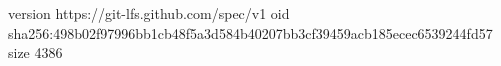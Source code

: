 version https://git-lfs.github.com/spec/v1
oid sha256:498b02f97996bb1cb48f5a3d584b40207bb3cf39459acb185ecec6539244fd57
size 4386
